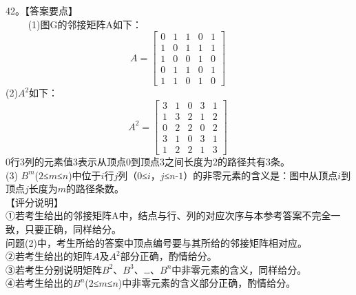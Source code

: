 42。【答案要点】 \\
$\qquad$ (1)图G的邻接矩阵A如下： \\
\begin{equation}
A=
\begin{bmatrix}
 0 & 1 & 1 & 0 & 1 \\
 1 & 0 & 1 & 1 & 1 \\
 1 & 0 & 0 & 1 & 0 \\
 0 & 1 & 1 & 0 & 1 \\
 1 & 1 & 0 & 1 & 0 
\end{bmatrix}
~
\end{equation}
(2)$A^2$如下：\\
\begin{equation}
A^2=
\begin{bmatrix}
 3 & 1 & 0 & 3 & 1 \\
 1 & 3 & 2 & 1 & 2 \\
 0 & 2 & 2 & 0 & 2 \\
 3 & 1 & 0 & 3 & 1 \\
 1 & 2 & 2 & 1 & 3 
\end{bmatrix}
~
\end{equation}
0行3列的元素值3表示从顶点0到顶点3之间长度为2的路径共有3条。\\
(3) $B^m$($2$≤$m$≤$n$)中位于$i$行$j$列（$0$≤$i$，$j$≤$n$-$1$）的非零元素的含义是：图中从顶点$i$到顶点$j$长度为$m$的路径条数。\\
【评分说明】\\
①若考生给出的邻接矩阵A中，结点与行、列的对应次序与本参考答案不完全一致，只要正确，同样给分。\\
问题(2)中，考生所给的答案中顶点编号要与其所给的邻接矩阵相对应。\\
②若考生给出的矩阵$A$及$A^2$部分正确，酌情给分。\\
③若考生分别说明矩阵$B^2$、$B^3$、…、$B^n$中非零元素的含义，同样给分。\\
④若考生给出的$B^n$($2$≤$m$≤$n$)中非零元素的含义部分正确，酌情给分。

